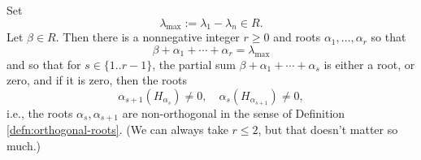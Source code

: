 \documentclass[reqno]{amsart} 
\begin{document}
\begin{lemma}\label{lemma:clean-way-to-get-simplicity}
  Set
  \begin{equation*}
\lambda_{\max} := \lambda_1 - \lambda_n \in R.
\end{equation*}
  Let $\beta \in R$.  Then there is a nonnegative integer $r \geq 0$ and roots $\alpha_1,\dotsc,\alpha_r$ so that
  \begin{equation*}
    \beta + \alpha_1 + \dotsb + \alpha_r = \lambda_{\max}
  \end{equation*}
  and so that for $s \in \{1..r-1\}$, the partial sum $\beta + \alpha_1 + \dotsb + \alpha_s$ is either a root, or zero, and if it is zero, then the roots
  \begin{equation}\label{eq:nonvanishing-required-for-simplicity}
    \alpha_{s+1}(H_{\alpha_s}) \neq 0,
    \quad 
    \alpha_{s}(H_{\alpha_{s+1}}) \neq 0,
  \end{equation}
  i.e., the roots $\alpha_s, \alpha_{s+1}$ are non-orthogonal in the sense of Definition \ref{defn:orthogonal-roots}.  (We can always take $r \leq 2$, but that doesn't matter so much.)
\end{lemma}
\end{document}
